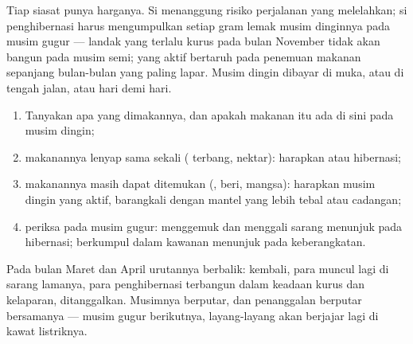 \begin{remark}\label{rem:g3:animals-through-seasons:cost}
Tiap siasat punya harganya. Si  menanggung risiko perjalanan
yang melelahkan; si penghibernasi harus mengumpulkan setiap gram lemak
musim dinginnya pada musim gugur --- landak yang terlalu kurus pada
bulan November tidak akan bangun pada musim semi;  yang aktif
bertaruh pada penemuan makanan sepanjang bulan-bulan yang paling
lapar. Musim dingin dibayar di muka, atau di tengah jalan, atau hari
demi hari.
\end{remark}

\begin{method}\label{met:g3:animals-through-seasons:guess}
\begin{enumerate}
  \item Tanyakan apa yang dimakannya, dan apakah makanan itu ada di
        sini pada musim dingin;
  \item makanannya lenyap sama sekali ( terbang, nektar):
        harapkan  atau hibernasi;
  \item makanannya masih dapat ditemukan (,  beri, mangsa):
        harapkan musim dingin yang aktif, barangkali dengan mantel
        yang lebih tebal atau cadangan;
  \item periksa pada musim gugur: menggemuk dan menggali sarang
        menunjuk pada hibernasi; berkumpul dalam kawanan menunjuk pada
        keberangkatan.
\end{enumerate}
\end{method}

\begin{example}\label{ex:g3:animals-through-seasons:spring}
Pada bulan Maret dan April urutannya berbalik:  kembali, para
 muncul lagi di sarang lamanya, para penghibernasi terbangun
dalam keadaan kurus dan kelaparan,  ditanggalkan.
Musimnya berputar, dan penanggalan  berputar bersamanya ---
musim gugur berikutnya,  layang-layang akan berjajar lagi di
kawat listriknya.
\end{example}

